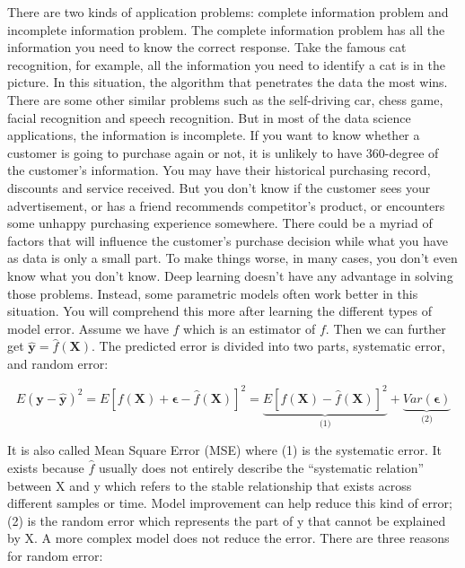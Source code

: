 \documentclass[12pt,]{krantz}
\begin{document}
There are two kinds of application problems: complete information problem and incomplete information problem. The complete information problem has all the information you need to know the correct response. Take the famous cat recognition, for example, all the information you need to identify a cat is in the picture. In this situation, the algorithm that penetrates the data the most wins. There are some other similar problems such as the self-driving car, chess game, facial recognition and speech recognition. But in most of the data science applications, the information is incomplete. If you want to know whether a customer is going to purchase again or not, it is unlikely to have 360-degree of the customer's information. You may have their historical purchasing record, discounts and service received. But you don't know if the customer sees your advertisement, or has a friend recommends competitor's product, or encounters some unhappy purchasing experience somewhere. There could be a myriad of factors that will influence the customer's purchase decision while what you have as data is only a small part. To make things worse, in many cases, you don't even know what you don't know. Deep learning doesn't have any advantage in solving those problems. Instead, some parametric models often work better in this situation. You will comprehend this more after learning the different types of model error.
Assume we have \(\hat{f}\) which is an estimator of \(f\). Then we can further get \(\mathbf{\hat{y}}=\hat{f}(\mathbf{X})\). The predicted error is divided into two parts, systematic error, and random error:

\begin{equation}
E(\mathbf{y}-\hat{\mathbf{y}})^{2}=E[f(\mathbf{X})+\mathbf{\epsilon}-\hat{f}(\mathbf{X})]^{2}=\underset{\text{(1)}}{\underbrace{E[f(\mathbf{X})-\hat{f}(\mathbf{X})]^{2}}}+\underset{\text{(2)}}{\underbrace{Var(\mathbf{\epsilon})}}
\label{eq:error}
\end{equation}

It is also called Mean Square Error (MSE) where (1) is the systematic error. It exists because \(\hat{f}\) usually does not entirely describe the ``systematic relation'' between X and y which refers to the stable relationship that exists across different samples or time. Model improvement can help reduce this kind of error; (2) is the random error which represents the part of y that cannot be explained by X. A more complex model does not reduce the error. There are three reasons for random error:
\end{document}
